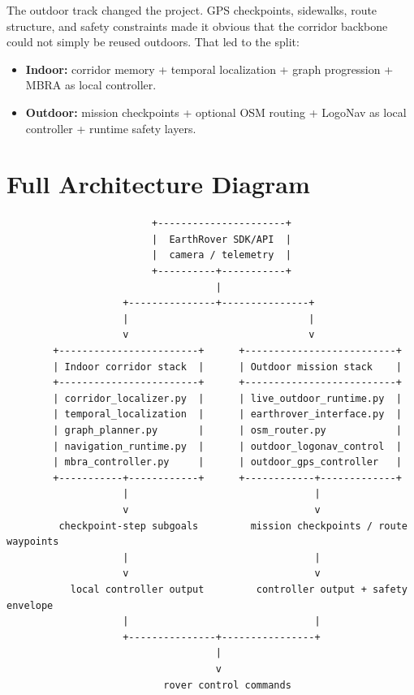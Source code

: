 \documentclass[11pt]{article}
\begin{document}
The outdoor track changed the project. GPS checkpoints, sidewalks, route structure,
and safety constraints made it obvious that the corridor backbone could not simply
be reused outdoors. That led to the split:

\begin{itemize}[nosep]
  \item \textbf{Indoor:} corridor memory + temporal localization + graph progression +
  MBRA as local controller.
  \item \textbf{Outdoor:} mission checkpoints + optional OSM routing + LogoNav as
  local controller + runtime safety layers.
\end{itemize}

\section{Full Architecture Diagram}

\begin{verbatim}
                         +----------------------+
                         |  EarthRover SDK/API  |
                         |  camera / telemetry  |
                         +----------+-----------+
                                    |
                    +---------------+---------------+
                    |                               |
                    v                               v
        +------------------------+      +--------------------------+
        | Indoor corridor stack  |      | Outdoor mission stack    |
        +------------------------+      +--------------------------+
        | corridor_localizer.py  |      | live_outdoor_runtime.py  |
        | temporal_localization  |      | earthrover_interface.py  |
        | graph_planner.py       |      | osm_router.py            |
        | navigation_runtime.py  |      | outdoor_logonav_control  |
        | mbra_controller.py     |      | outdoor_gps_controller   |
        +-----------+------------+      +------------+-------------+
                    |                                |
                    v                                v
         checkpoint-step subgoals         mission checkpoints / route waypoints
                    |                                |
                    v                                v
           local controller output         controller output + safety envelope
                    |                                |
                    +---------------+----------------+
                                    |
                                    v
                           rover control commands
\end{verbatim}
\end{document}

